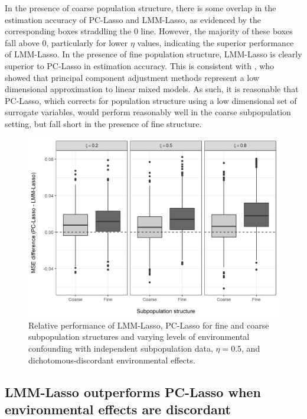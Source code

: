 In the presence of coarse population structure, there is some overlap in the estimation accuracy of PC-Lasso and LMM-Lasso, as evidenced by the corresponding boxes straddling the 0 line. However, the majority of these boxes fall above 0, particularly for lower $\eta$ values, indicating the superior performance of LMM-Lasso. In the presence of fine population structure, LMM-Lasso is clearly superior to PC-Lasso in estimation accuracy. This is consistent with \citet{hoffman2013correcting}, who showed that principal component adjustment methods represent a low dimensional approximation to linear mixed models. As such, it is reasonable that PC-Lasso, which corrects for population structure using a low dimensional set of surrogate variables, would perform reasonably well in the coarse subpopulation setting, but fall short in the presence of fine structure. 
\begin{figure}[H]
    \centering
     \includegraphics[scale = 0.9]{figures/mse_diff_subpops.png}
    \caption{Relative performance of LMM-Lasso, PC-Lasso for fine and coarse subpopulation structures and varying levels of environmental confounding with independent subpopulation data, $\eta = 0.5$, and dichotomous-discordant environmental effects.}
    \label{fig:big_vs_small}
\end{figure}


\subsection{LMM-Lasso outperforms PC-Lasso when environmental effects are discordant}

